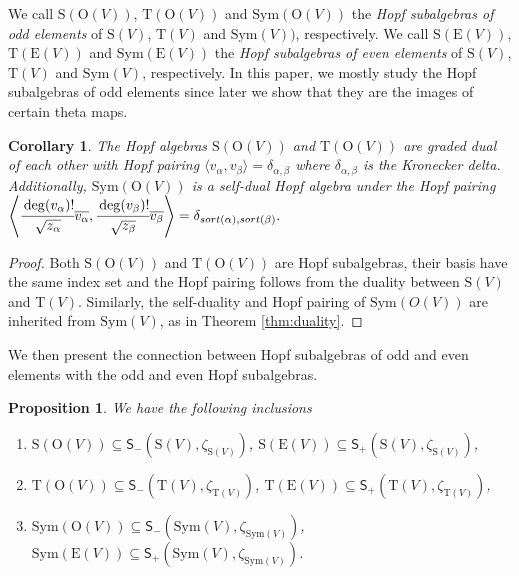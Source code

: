 \documentclass[12pt]{amsart}
\newtheorem{corollary}[theorem]{Corollary}
\newtheorem{proposition}[theorem]{Proposition}
\numberwithin{equation}{section}
\newcommand{\Sym}{\mathrm{Sym}}
\newcommand{\rmO}{\mathrm{O}}
\newcommand{\rmT}{\mathrm{T}}
\newcommand{\rmS}{\mathrm{S}}
\newcommand{\sfS}{\mathsf{S}}
\newcommand{\rmE}{\mathrm{E}}
\begin{document}
We call $\rmS(\rmO(V))$, $\rmT(\rmO(V))$ and $\Sym(\rmO(V))$ the {\it Hopf subalgebras of odd elements} of $\rmS(V)$, $\rmT(V)$ and $\Sym(V))$, respectively. We call $\rmS(\rmE(V))$, $\rmT(\rmE(V))$ and $\Sym(\rmE(V))$ the {\it Hopf subalgebras of even elements} of $\rmS(V)$, $\rmT(V)$ and $\Sym(V)$, respectively. In this paper, we mostly study the Hopf subalgebras of odd elements since later we show that they are the images of certain theta maps.

\begin{corollary}\label{coro:duality}
	The Hopf algebras $\rmS(\rmO(V))$ and $\rmT(\rmO(V))$ are graded dual of each other with Hopf pairing $\langle v_\alpha,v_\beta \rangle=\delta_{\alpha,\beta}$ where $\delta_{\alpha,\beta}$ is the Kronecker delta. Additionally, $\Sym(\rmO(V))$ is a self-dual Hopf algebra under the Hopf pairing $\left\langle \cfrac{\deg(v_\alpha)!}{\sqrt{z_\alpha}}\overline{v_\alpha},\cfrac{\deg(v_\beta)!}{\sqrt{z_\beta}}\overline{v_\beta} \right\rangle=\delta_{{\rm sort}(\alpha),{\rm sort}(\beta)}.$
\end{corollary}

\begin{proof}
	Both $\rmS(\rmO(V))$ and $\rmT(\rmO(V))$ are Hopf subalgebras, their basis have the same index set and the Hopf pairing follows from the duality between $\rmS(V)$ and $\rmT(V)$. Similarly, the self-duality and Hopf pairing of $\Sym(O(V))$ are inherited from $\Sym(V)$, as in Theorem \ref{thm:duality}.
\end{proof}

We then present the connection between Hopf subalgebras of odd and even elements with the odd and even Hopf subalgebras.

\begin{proposition}
	We have the following inclusions
	\begin{enumerate}
		\item $\rmS(\rmO(V)) \subseteq \sfS_{-}(\rmS(V),\zeta_{\rmS(V)})$, $\rmS(\rmE(V)) \subseteq \sfS_{+}(\rmS(V),\zeta_{\rmS(V)})$,
		\item $\rmT(\rmO(V)) \subseteq \sfS_{-}(\rmT(V),\zeta_{\rmT(V)})$, $\rmT(\rmE(V)) \subseteq \sfS_{+}(\rmT(V),\zeta_{\rmT(V)})$,
		\item $\Sym(\rmO(V)) \subseteq \sfS_{-}(\Sym(V),\zeta_{\Sym(V)})$, $\Sym(\rmE(V)) \subseteq \sfS_{+}(\Sym(V),\zeta_{\Sym(V)})$.
	\end{enumerate}
\end{proposition}
\end{document}
